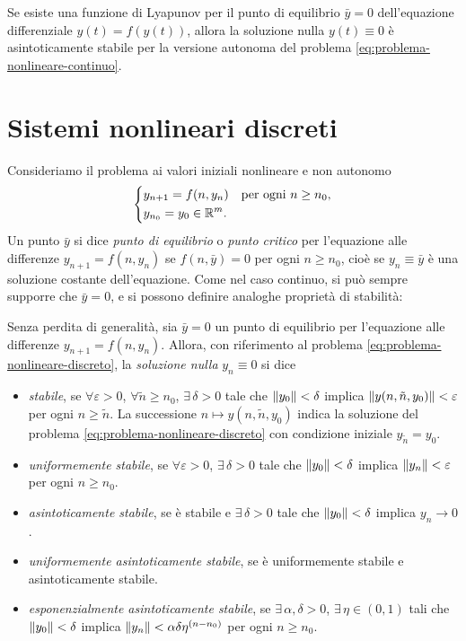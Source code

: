 \begin{teor}
Se esiste una funzione di Lyapunov per il punto di equilibrio $\bar{y} = 0$
dell'equazione differenziale $y(t) = f(y(t))$, allora la soluzione nulla
$y(t) \equiv 0$ è asintoticamente stabile per la versione autonoma del
problema \eqref{eq:problema-nonlineare-continuo}.
\end{teor}

\section{Sistemi nonlineari discreti}

Consideriamo il problema ai valori iniziali nonlineare e non autonomo
\begin{equation} \label{eq:problema-nonlineare-discreto}
\left\{
\begin{aligned}
& y_{n+1} = f(n,y_n) \quad \text{per ogni $n \geq n_0$}, \\
& y_{n_0} = y_0 \in \mathbb{R}^m.
\end{aligned}
\right.
\end{equation}
Un punto $\bar{y}$ si dice \emph{punto di equilibrio} o \emph{punto critico}
per l'equazione alle differenze $y_{n+1} = f(n,y_n)$ se $f(n,\bar{y}) = 0$
per ogni $n \geq n_0$, cioè se $y_n \equiv \bar{y}$ è una soluzione
costante dell'equazione. Come nel caso continuo, si può sempre supporre che
$\bar{y} = 0$, e si possono definire analoghe proprietà di stabilità:

\begin{defi}
Senza perdita di generalità, sia $\bar{y} = 0$ un punto di equilibrio
per l'equazione alle differenze $y_{n+1} = f(n,y_n)$. Allora, con riferimento
al problema \eqref{eq:problema-nonlineare-discreto}, la \emph{soluzione nulla}
$y_n \equiv 0$ si dice
\begin{itemize}
\item \emph{stabile},
	se $\forall \varepsilon > 0$,
	$\forall \tilde{n} \geq n_0$,
	$\exists\, \delta > 0$
	tale che $\left\lVert y_0\right\rVert < \delta$
	implica $\left\lVert y(n,\tilde{n},y_0)\right\rVert < \varepsilon$
	per ogni $n \geq \tilde{n}$.
	La successione $n \mapsto y(n,\tilde{n},y_0)$ indica la soluzione del problema
	\eqref{eq:problema-nonlineare-discreto} con condizione iniziale $y_{\tilde{n}} = y_0$.
\item \emph{uniformemente stabile},
	se $\forall \varepsilon > 0$,
	$\exists\, \delta > 0$
	tale che $\left\lVert y_0\right\rVert < \delta$
	implica $\left\lVert y_n\right\rVert < \varepsilon$
	per ogni $n \geq n_0$.
\item \emph{asintoticamente stabile},
	se è stabile e
	$\exists\, \delta > 0$
	tale che $\left\lVert y_0\right\rVert < \delta$
	implica $y_n \to 0$.
\item \emph{uniformemente asintoticamente stabile},
	se è uniformemente stabile e asintoticamente stabile.
\item \emph{esponenzialmente asintoticamente stabile},
	se $\exists\, \alpha,\delta > 0$,
	$\exists\, \eta \in (0,1)$
	tali che $\left\lVert y_0\right\rVert < \delta$
	implica $\left\lVert y_n\right\rVert < \alpha \delta \eta^{(n-n_0)}$
	per ogni $n \geq n_0$.
\end{itemize}
\end{defi}

